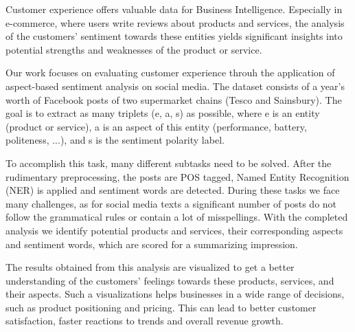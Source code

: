 Customer experience offers valuable data for Business Intelligence. Especially in e-commerce, where users write reviews about products and services, the analysis of the customers' sentiment towards these entities yields significant insights into potential strengths and weaknesses of the product or service.

Our work focuses on evaluating customer experience throuh the application of aspect-based sentiment analysis on social media. The dataset consists of a year's worth of Facebook posts of two supermarket chains (Tesco and Sainsbury). The goal is to extract as many triplets (e, a, s) as possible, where e is an entity (product or service), a is an aspect of this entity (performance, battery, politeness, ...), and s is the sentiment polarity label.

To accomplish this task, many different subtasks need to be solved. After the rudimentary preprocessing, the posts are POS tagged, Named Entity Recognition (NER) is applied and sentiment words are detected. During these tasks we face many challenges, as for social media texts a significant number of posts do not follow the grammatical rules or contain a lot of misspellings. With the completed analysis we identify potential products and services, their corresponding aspects and sentiment words, which are scored for a summarizing impression.

The results obtained from this analysis are visualized to get a better understanding of the customers' feelings towards these products, services, and their aspects. Such a visualizations helps businesses in a wide range of decisions, such as product positioning and pricing. This can lead to better customer satisfaction, faster reactions to trends and overall revenue growth.